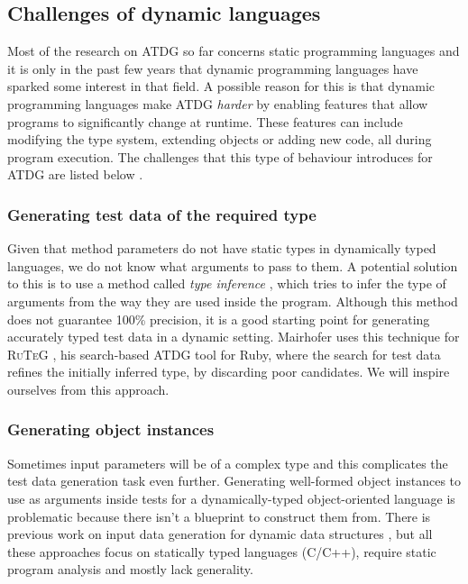 

\subsection{Challenges of dynamic languages}

Most of the research on ATDG so far concerns static programming languages \cite{mahmood2007systematic} and it is only in the past few years that dynamic programming languages have sparked some interest in that field. A possible reason for this is that dynamic programming languages make ATDG \emph{harder} by enabling features that allow programs to significantly change at runtime. These features can include modifying the type system, extending objects or adding new code, all during program execution. The challenges that this type of behaviour introduces for ATDG are listed below \cite{ducasse2011challenges}.

\subsubsection{Generating test data of the required type}
Given that method parameters do not have static types in dynamically typed languages, we do not know what arguments to pass to them. A potential solution to this is to use a method called \emph{type inference} \cite{pluquet2009fast}, which tries to infer the type of arguments from the way they are used inside the program. Although this method does not guarantee 100\% precision, it is a good starting point for generating accurately typed test data in a dynamic setting. Mairhofer uses this technique for \textsc{\small RuTeG} \cite{mairhofer2008search}, his search-based ATDG tool for Ruby, where the search for test data refines the initially inferred type, by discarding poor candidates. We will inspire ourselves from this approach.

\subsubsection{Generating object instances}
Sometimes input parameters will be of a complex type and this complicates the test data generation task even further. Generating well-formed object instances to use as arguments inside tests for a dynamically-typed object-oriented language is problematic because there isn't a blueprint to construct them from. There is previous work on input data generation for dynamic data structures \cite{korel1990automated, visvanathan2002generating, sai2005address, zhao2007automatic}, but all these approaches focus on statically typed languages (C/C++), require static program analysis and mostly lack generality.

